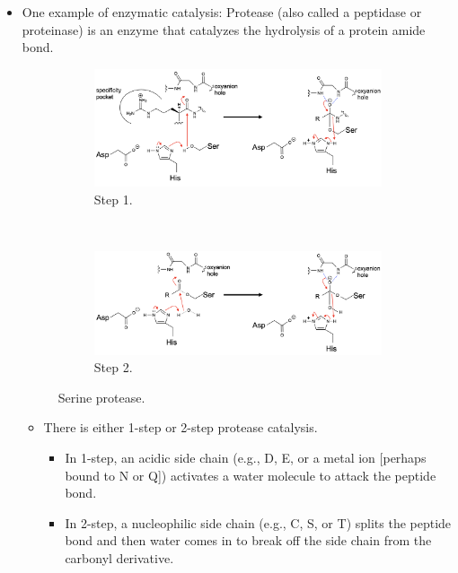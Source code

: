 \documentclass[../notes.tex]{subfiles}
\begin{document}
\begin{itemize}
\begin{itemize}
    \end{itemize}
    \item One example of enzymatic catalysis: Protease (also called a peptidase or proteinase) is an enzyme that catalyzes the hydrolysis of a protein amide bond.
    \begin{figure}[h!]
        \centering
        \begin{subfigure}[b]{\linewidth}
            \centering
            \includegraphics[width=0.8\linewidth]{../ExtFiles/serineProteasea.png}
            \caption{Step 1.}
            \label{fig:serineProteasea}
        \end{subfigure}\\[2em]
        \begin{subfigure}[b]{\linewidth}
            \centering
            \includegraphics[width=0.8\linewidth]{../ExtFiles/serineProteaseb.png}
            \caption{Step 2.}
            \label{fig:serineProteaseb}
        \end{subfigure}
        \caption{Serine protease.}
        \label{fig:serineProtease}
    \end{figure}
    \begin{itemize}
        \item There is either 1-step or 2-step protease catalysis.
        \begin{itemize}
            \item In 1-step, an acidic side chain (e.g., D, E, or a metal ion [perhaps bound to N or Q]) activates a water molecule to attack the peptide bond.
            \item In 2-step, a nucleophilic side chain (e.g., C, S, or T) splits the peptide bond and then water comes in to break off the side chain from the carbonyl derivative.

\end{itemize}
\end{itemize}
\end{itemize}
\end{document}
